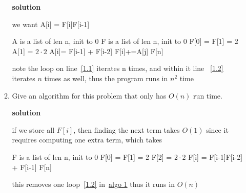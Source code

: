 \documentclass[letterpaper,12pt]{article}
\begin{document}
\begin{enumerate}
\begin{enumerate}
\textbf{solution}

we want A[i] = F[i]F[i-1]

\begin{algorithmic}[1]\label{algo1.1}
    \State A is a list of len n, init to 0
    \State F is a list of len n, init to 0
    \State F[0] = F[1] = 2 
    \State A[1] = \(2\cdot 2\)
    \label{1.1}
        \State A[i]= F[i-1] + F[i-2]
        \label{1.2}
            \State F[i]+=A[j]
        \EndFor
    \EndFor
    \State \Return F[n]
\end{algorithmic}

note the loop on line~\ref{1.1} iterates n times, and within it line ~\ref{1.2} iterates \(n\) times as well, thus the program runs in \(n^2\) time


\item
Give an algorithm for this problem that only has $O(n)$ 
run time. 

\textbf{solution}






if we store all \(F[i]\), then finding the next term takes \(O(1)\) since it requires computing one extra term, which takes 

\begin{algorithmic}[1]
    \State F is a list of len n, init to 0
    \State F[0] = F[1] = 2 
    \State F[2] = \(2\cdot 2\)
    \label{1.2.1}
        \State F[i] = F[i-1]F[i-2] + F[i-1]
    \EndFor
    \State \Return F[n]
\end{algorithmic}

this removes one loop~\ref{1.2} in~\hyperref[algo1.1]{algo 1} thus it runs in \(O(n)\)



\end{enumerate}
\end{enumerate}
\end{document}
